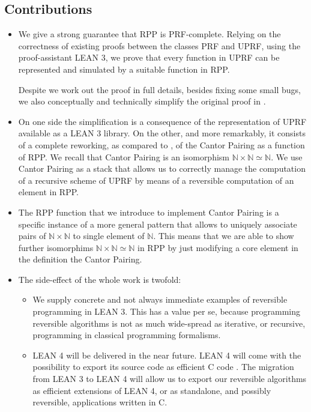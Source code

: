 \documentclass[runningheads]{llncs}
\newcommand{\RPP}{\textsf{RPP}\xspace}
\newcommand{\UPRF}{\textsf{UPRF}\xspace}
\newcommand{\PRF}{\textsf{PRF}\xspace}
\newcommand{\CPP}{\textsf{C}\xspace}
\newcommand{\LEAN}{\textsf{LEAN 3}\xspace}
\newcommand{\LEANFour}{\textsf{LEAN 4}\xspace}
\begin{document}
\subsection{Contributions}
\begin{itemize}
    \item We give a strong guarantee that \RPP is \PRF-complete.
    Relying on the correctness of existing proofs between the classes \PRF and \UPRF, using the proof-assistant \LEAN, we prove that every function in \UPRF can be represented and simulated by a suitable function in \RPP.

    Despite we work out the proof in full details, besides fixing some small bugs, we also conceptually and technically simplify the original proof in  \cite{DBLP:journals/tcs/PaoliniPR20}.

    \item On one side the simplification is a consequence of the representation of \UPRF available as a \LEAN library. On the other, and more remarkably, it consists of a complete reworking, as compared to \cite{DBLP:journals/tcs/PaoliniPR20}, of the Cantor Pairing \cite{???} as a function of \RPP. We recall that Cantor Pairing is an isomorphism $ \mathbb{N}\times\mathbb{N} \simeq \mathbb{N} $. We use Cantor Pairing  as a stack that allows us to correctly manage the computation of a recursive scheme of \UPRF by means of a reversible computation of an element in \RPP.

    \item The \RPP function that we introduce to implement Cantor Pairing is a specific instance of a more general pattern that allows to uniquely associate pairs of $ \mathbb{N}\times\mathbb{N}$ to single element of $ \mathbb{N}$. This means that we are able to show further isomorphims  $ \mathbb{N}\times\mathbb{N}\simeq \mathbb{N}$ in \RPP by just modifying a core element in the definition the Cantor Pairing.

    \item The side-effect of the whole work is twofold:
    \begin{itemize}
        \item We supply concrete and not always immediate examples of reversible programming in \LEAN. This has a value per se, because programming reversible algorithms is not as much wide-spread as iterative, or recursive, programming in classical programming formalisms.
        \item \LEANFour will be delivered in the near future. \LEANFour will come with the possibility to export its source code as efficient \CPP code \cite{2021-LEAN4-MouraUllrich}. The migration from \LEAN to \LEANFour will allow us to export our reversible algorithms as efficient extensions of \LEANFour, or as standalone, and possibly reversible, applications written in \CPP.
    \end{itemize}
\end{itemize}
\end{document}
